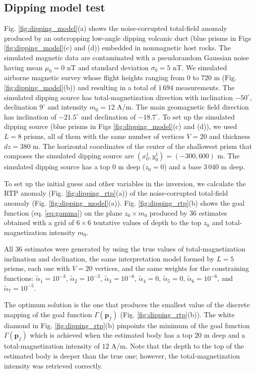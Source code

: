 \subsection{Dipping model test}

Fig. \ref{fig:dipping_model}(a) shows the noise-corrupted total-field anomaly produced by an outcropping low-angle dipping volcanic duct (blue prisms in Figs \ref{fig:dipping_model}(c) and (d)) embedded in nonmagnetic host rocks. 
The simulated magnetic data are contaminated with a pseudorandom Gaussian noise having mean $ \mu_0=0 $ nT and standard deviation $ \sigma_0 = 5 $ nT.
We simulated airborne magnetic survey whose flight heights ranging from 0 to $ 720 $ m
(Fig. \ref{fig:dipping_model}(b)) and resulting in a total of $ 1\,694 $ measurements.
The simulated dipping source has total-magnetization direction with inclination 
$ -50^\circ $, declination $ 9^\circ $ and intensity $ m_0 = 12 $ A/m.
The main geomagnetic field direction has inclination of $ -21.5^\circ $ and declination of $ -18.7^\circ $.
To set up the simulated dipping source (blue prisms in Figs \ref{fig:dipping_model}(c) and (d)),
we used $L=8$ prisms, all of them with the same number of vertices $ V = 20 $ and thickness 
$ dz = 380 $ m. 
The horizontal coordinates of the center of the shallowest prism that composes the
simulated dipping source are $ (x_0^1, y_0^1) = (-300, 600) $ m. 
The simulated dipping source has a top 0 m deep ($z_0 = 0$) and a base $ 3\,040 $ m deep.

To set up the initial guess and other variables in the inversion, we calculate the RTP anomaly (Fig. \ref{fig:dipping_rtp}(a)) of the noise-corrupted total-field anomaly (Fig. \ref{fig:dipping_model}(a)).
Fig. \ref{fig:dipping_rtp}(b) shows the goal function (eq. \ref{eq:gamma}) on the plane 
$z_0 \times m_0 $ produced by 36 estimates obtained with a grid of $6 \times 6$ tentative values of depth to the top $z_0$ and total-magnetization intensity $m_0$. 

All $ 36 $ estimates were generated by using the true values of total-magnetization inclination and declination, the same interpretation model formed by $ L = 5 $ prisms, 
each one with $ V = 20 $ vertices, and the same weights for the constraining functions: 
$\tilde{\alpha}_1 = 10^{-3}$, 
$\tilde{\alpha}_2 = 10^{-3}$, 
$\tilde{\alpha}_3 = 10^{-6}$, 
$\tilde{\alpha}_4 = 0$, 
$\tilde{\alpha}_5 = 0$, 
$\tilde{\alpha}_6 = 10^{-6}$, and 
$\tilde{\alpha}_7 = 10^{-5}$. 


The optimum solution is the one that produces the smallest value of the discrete mapping 
of the goal function $\Gamma(\mathbf{p}_f)$ (Fig. \ref{fig:dipping_rtp}(b)). 
The white diamond in Fig. \ref{fig:dipping_rtp}(b) pinpoints the minimum of the goal function $\Gamma(\mathbf{p}_f)$ which is achieved when the estimated body has a top $ 20 $ m deep and a total-magnetization intensity of $ 12 $ A/m. 
Note that the depth to the top of the estimated body is deeper than the true one; 
however, the total-magnetization intensity was retrieved correctly.

